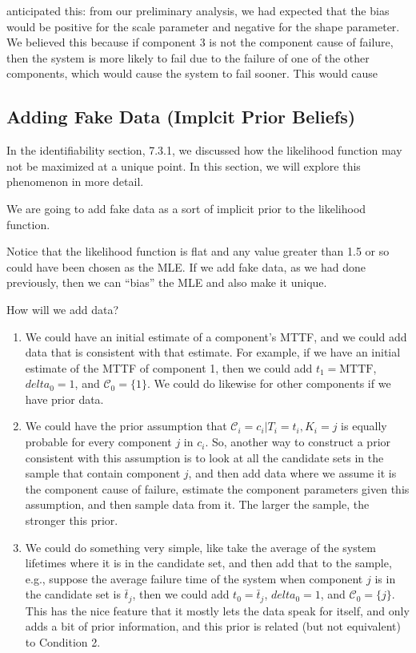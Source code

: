 \documentclass[
]{article}
\begin{document}
\begin{enumerate}
  anticipated this: from our preliminary analysis, we had expected that
  the bias would be positive for the scale parameter and negative for
  the shape parameter. We believed this because if component 3 is not
  the component cause of failure, then the system is more likely to fail
  due to the failure of one of the other components, which would cause
  the system to fail sooner. This would cause
\end{enumerate}

\hypertarget{adding-fake-data-implcit-prior-beliefs}{%
\subsection{Adding Fake Data (Implcit Prior
Beliefs)}\label{adding-fake-data-implcit-prior-beliefs}}

In the identifiability section, 7.3.1, we discussed how the likelihood
function may not be maximized at a unique point. In this section, we
will explore this phenomenon in more detail.

We are going to add fake data as a sort of implicit prior to the
likelihood function.

Notice that the likelihood function is flat and any value greater than
1.5 or so could have been chosen as the MLE. If we add fake data, as we
had done previously, then we can ``bias'' the MLE and also make it
unique.

How will we add data?

\begin{enumerate}
\def\labelenumi{\arabic{enumi}.}
\item
  We could have an initial estimate of a component's MTTF, and we could
  add data that is consistent with that estimate. For example, if we
  have an initial estimate of the MTTF of component 1, then we could add
  \(t_1 = \text{MTTF}\), \(delta_0 = 1\), and \(\mathcal{C}_0 = \{1\}\).
  We could do likewise for other components if we have prior data.
\item
  We could have the prior assumption that
  \(\mathcal{C}_i = c_i | T_i = t_i, K_i = j\) is equally probable for
  every component \(j\) in \(c_i\). So, another way to construct a prior
  consistent with this assumption is to look at all the candidate sets
  in the sample that contain component \(j\), and then add data where we
  assume it is the component cause of failure, estimate the component
  parameters given this assumption, and then sample data from it. The
  larger the sample, the stronger this prior.
\item
  We could do something very simple, like take the average of the system
  lifetimes where it is in the candidate set, and then add that to the
  sample, e.g., suppose the average failure time of the system when
  component \(j\) is in the candidate set is \(\bar{t}_j\), then we
  could add \(t_0 = \bar{t}_j\), \(delta_0 = 1\), and
  \(\mathcal{C}_0 = \{j\}\). This has the nice feature that it mostly
  lets the data speak for itself, and only adds a bit of prior
  information, and this prior is related (but not equivalent) to
  Condition 2.
\end{enumerate}
\end{document}
